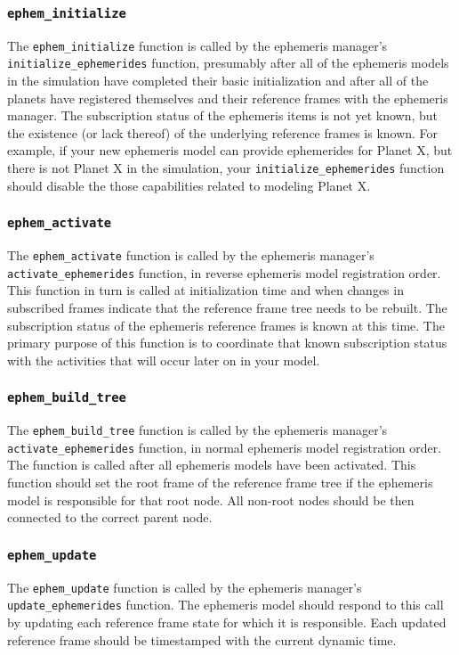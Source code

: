\subsubsection{\texttt{ephem\_initialize}}
The \texttt{ephem\_initialize} function is called by the
ephemeris manager's \texttt{initialize\_ephemerides} function,
presumably after all of the ephemeris models in the simulation have completed
their basic initialization and after all of the planets have registered
themselves and their reference frames with the ephemeris manager.
The subscription status of the ephemeris items is not yet known, but
the existence (or lack thereof) of the underlying reference frames is known.
For example, if your new ephemeris model can provide ephemerides for
Planet X, but there is not Planet X in the simulation, your
\texttt{initialize\_ephemerides} function should disable the
those capabilities related to modeling Planet X.

\subsubsection{\texttt{ephem\_activate}}
The \texttt{ephem\_activate} function is called by the
ephemeris manager's \texttt{activate\_ephemerides} function,
in reverse ephemeris model registration order.
This function in turn is called at initialization time and
when changes in subscribed frames indicate that the reference
frame tree needs to be rebuilt. The subscription status of the
ephemeris reference frames is known at this time. The primary
purpose of this function is to coordinate that known subscription status
with the activities that will occur later on in your model.

\subsubsection{\texttt{ephem\_build\_tree}}
The \texttt{ephem\_build\_tree} function is called by the
ephemeris manager's \texttt{activate\_ephemerides} function,
in normal ephemeris model registration order.
The function is called after all ephemeris models have been
activated.
This function should set the root frame of the reference frame tree
if the ephemeris model is responsible for that root node. All
non-root nodes should be then connected to the correct parent node.

\subsubsection{\texttt{ephem\_update}}
The \texttt{ephem\_update} function is called by the
ephemeris manager's \texttt{update\_ephemerides} function.
The ephemeris model should respond to this call by updating
each reference frame state for which it is responsible.
Each updated reference frame should be timestamped with the current
dynamic time.

